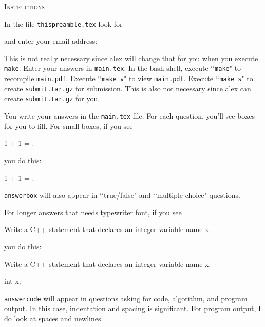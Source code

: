 \textsc{Instructions}

In the file \verb!thispreamble.tex! look for 
\begin{console}
\renewcommand\AUTHOR{} 
\end{console}
and enter your email address:
\begin{console}
\renewcommand\AUTHOR{jdoe5@cougars.ccis.edu} 
\end{console}
This is not really necessary since alex will change that for you
when you execute \verb!make!.
Enter your answers in \verb!main.tex!.
In the bash shell, execute \lq\lq \verb!make!" to recompile \verb!main.pdf!.
Execute \lq\lq \verb!make v!" to view \verb!main.pdf!.
Execute \lq\lq \verb!make s!" to create \verb!submit.tar.gz! for submission.
This is also not necessary since alex can create \verb!submit.tar.gz! for you.

You write your answers in the \verb!main.tex! file.
For each question, you'll see boxes for you to fill.
For small boxes, if you see
\begin{console}[frame=single=single,fontsize=\small]
1 + 1 = \answerbox{}.
\end{console}
you do this:
\begin{console}[frame=single=single,fontsize=\small]
1 + 1 = .
\end{console}
\verb!answerbox! will also appear in
\lq\lq true/false" and \lq\lq multiple-choice"
questions.

For longer answers that needs typewriter font, if you see
\begin{console}[frame=single=single, fontsize=\small]
Write a C++ statement that declares an integer variable name x.
\begin{answercode}
\end{answercode}
\end{console}
you do this:
\begin{console}[frame=single=single, fontsize=\small]
Write a C++ statement that declares an integer variable name x.
\begin{answercode}
int x;
\end{answercode}
\end{console}
\verb!answercode! will appear in questions asking for
code, algorithm, and program output.
In this case, indentation and spacing is significant.
For program output, I do look at spaces and newlines.

